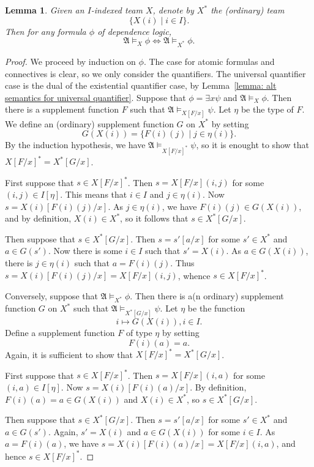 \documentclass[10pt,a4paper]{amsart}
\newtheorem{lemma}[definition]{Lemma}
\newcommand{\A}{\mathfrak{A}}
\begin{document}
\begin{lemma}\label{lemma: indexing does not change semantics}
    Given an $I$-indexed team $X$, denote by $X^*$ the (ordinary) team
    \[
        \{ X(i) \mid i\in I \}.
    \]
    Then for any formula $\phi$ of dependence logic,
    \[
        \A\models_X\phi \iff \A\models_{X^*}\phi.
    \]
\end{lemma}
\begin{proof}
    We proceed by induction on $\phi$. The case for atomic formulas and connectives is clear, so we only consider the quantifiers. The universal quantifier case is the dual of the existential quantifier case, by Lemma~\ref{lemma: alt semantics for universal quantifier}. Suppose that $\phi = \exists x\psi$ and $\A\models_X\phi$. Then there is a supplement function $F$ such that $\A\models_{X[F/x]}\psi$. Let $\eta$ be the type of $F$. We define an (ordinary) supplement function $G$ on $X^*$ by setting
    \[
        G(X(i)) = \{ F(i)(j) \mid j\in\eta(i) \}.
    \]
    By the induction hypothesis, we have $\A\models_{X[F/x]^*}\psi$, so it is enought to show that $X[F/x]^* = X^*[G/x]$.
    
    First suppose that $s\in X[F/x]^*$. Then $s = X[F/x](i,j)$ for some $(i,j)\in I[\eta]$. This means that $i\in I$ and $j\in\eta(i)$. Now $s = X(i)[F(i)(j)/x]$. As $j\in\eta(i)$, we have $F(i)(j)\in G(X(i))$, and by definition, $X(i)\in X^*$, so it follows that $s\in X^*[G/x]$.

    Then suppose that $s\in X^*[G/x]$. Then $s = s'[a/x]$ for some $s'\in X^*$ and $a\in G(s')$. Now there is some $i\in I$ such that $s' = X(i)$. As $a\in G(X(i))$, there is $j\in\eta(i)$ such that $a = F(i)(j)$. Thus $s = X(i)[F(i)(j)/x] = X[F/x](i,j)$, whence $s\in X[F/x]^*$.

    Conversely, suppose that $\A\models_{X^*}\phi$. Then there is a(n ordinary) supplement function $G$ on $X^*$ such that $\A\models_{X^*[G/x]}\psi$. Let $\eta$ be the function
    \[
        i\mapsto G(X(i)), i\in I.
    \]
    Define a supplement function $F$ of type $\eta$ by setting
    \[
        F(i)(a) = a.
    \]
    Again, it is sufficient to show that $X[F/x]^* = X^*[G/x]$.

    First suppose that $s\in X[F/x]^*$. Then $s = X[F/x](i,a)$ for some $(i,a)\in I[\eta]$. Now $s = X(i)[F(i)(a)/x]$. By definition, $F(i)(a) = a\in G(X(i))$ and $X(i)\in X^*$, so $s\in X^*[G/x]$.

    Then suppose that $s\in X^*[G/x]$. Then $s = s'[a/x]$ for some $s'\in X^*$ and $a\in G(s')$. Again, $s' = X(i)$ and $a\in G(X(i))$ for some $i\in I$. As $a = F(i)(a)$, we have $s = X(i)[F(i)(a)/x] = X[F/x](i,a)$, and hence $s\in X[F/x]^*$.
\end{proof}
\end{document}
